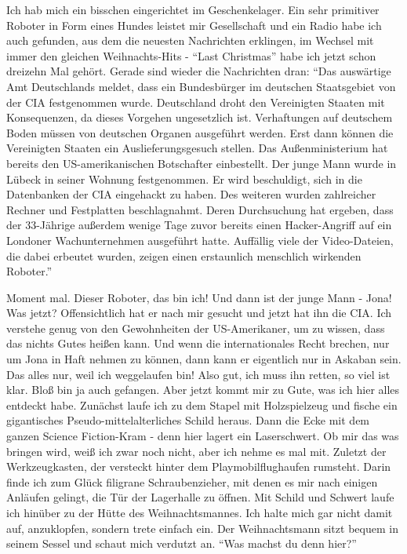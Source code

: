 Ich hab mich ein bisschen eingerichtet im Geschenkelager. Ein sehr primitiver Roboter in Form eines Hundes leistet mir Gesellschaft und ein Radio habe ich auch gefunden, aus dem die neuesten Nachrichten erklingen, im Wechsel mit immer den gleichen Weihnachts-Hits - "`Last Christmas"'  habe ich jetzt schon dreizehn Mal gehört. Gerade sind wieder die Nachrichten dran: "`Das auswärtige Amt Deutschlands meldet, dass ein Bundesbürger im deutschen Staatsgebiet von der CIA festgenommen wurde. Deutschland droht den Vereinigten Staaten mit Konsequenzen, da dieses Vorgehen ungesetzlich ist. Verhaftungen auf deutschem Boden müssen von deutschen Organen ausgeführt werden. Erst dann können die Vereinigten Staaten ein Auslieferungsgesuch stellen. Das Außenministerium hat bereits den US-amerikanischen Botschafter einbestellt. Der junge Mann wurde in Lübeck in seiner Wohnung festgenommen. Er wird beschuldigt, sich in die Datenbanken der CIA eingehackt zu haben. Des weiteren wurden zahlreicher Rechner und Festplatten beschlagnahmt. Deren Durchsuchung hat ergeben, dass der 33-Jährige außerdem wenige Tage zuvor bereits einen Hacker-Angriff auf ein Londoner Wachunternehmen ausgeführt hatte. Auffällig viele der Video-Dateien, die dabei erbeutet wurden, zeigen einen erstaunlich menschlich wirkenden Roboter."'

Moment mal. Dieser Roboter, das bin ich! Und dann ist der junge Mann - Jona! Was jetzt? Offensichtlich hat er nach mir gesucht und jetzt hat ihn die CIA. Ich verstehe genug von den Gewohnheiten der US-Amerikaner, um zu wissen, dass das nichts Gutes heißen kann. Und wenn die internationales Recht brechen, nur um Jona in Haft nehmen zu können, dann kann er eigentlich nur in Askaban sein. Das alles nur, weil ich weggelaufen bin! Also gut, ich muss ihn retten, so viel ist klar. Bloß bin ja auch gefangen. Aber jetzt kommt mir zu Gute, was ich hier alles entdeckt habe. Zunächst laufe ich zu dem Stapel mit Holzspielzeug und fische ein gigantisches Pseudo-mittelalterliches Schild heraus. Dann die Ecke mit dem ganzen Science Fiction-Kram - denn hier lagert ein Laserschwert. Ob mir das was bringen wird, weiß ich zwar noch nicht, aber ich nehme es mal mit. Zuletzt der Werkzeugkasten, der versteckt hinter dem Playmobilflughaufen rumsteht. Darin finde ich zum Glück filigrane Schraubenzieher, mit denen es mir nach einigen Anläufen gelingt, die Tür der Lagerhalle zu öffnen. Mit Schild und Schwert laufe ich hinüber zu der Hütte des Weihnachtsmannes. Ich halte mich gar nicht damit auf, anzuklopfen, sondern trete einfach ein. Der Weihnachtsmann sitzt bequem in seinem Sessel und schaut mich verdutzt an. "`Was machst du denn hier?"'

